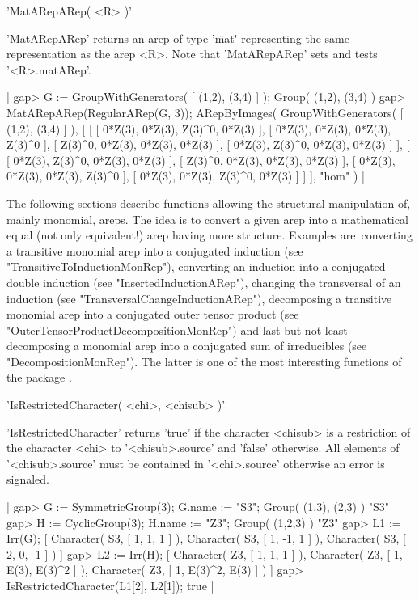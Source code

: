 
'MatARepARep( <R> )'

'MatARepARep' returns an arep of type '\"mat\"' representing 
the same representation as the arep <R>.
Note that 'MatARepARep' sets and tests '<R>.matARep'.

|    gap> G := GroupWithGenerators( [ (1,2), (3,4) ] );
    Group( (1,2), (3,4) )
    gap> MatARepARep(RegularARep(G, 3));
    ARepByImages(
      GroupWithGenerators( [ (1,2), (3,4) ] ),
      [ [ [ 0*Z(3), 0*Z(3), Z(3)^0, 0*Z(3) ], 
          [ 0*Z(3), 0*Z(3), 0*Z(3), Z(3)^0 ], 
          [ Z(3)^0, 0*Z(3), 0*Z(3), 0*Z(3) ], 
          [ 0*Z(3), Z(3)^0, 0*Z(3), 0*Z(3) ] ],
        [ [ 0*Z(3), Z(3)^0, 0*Z(3), 0*Z(3) ], 
          [ Z(3)^0, 0*Z(3), 0*Z(3), 0*Z(3) ], 
          [ 0*Z(3), 0*Z(3), 0*Z(3), Z(3)^0 ], 
          [ 0*Z(3), 0*Z(3), Z(3)^0, 0*Z(3) ] ]
      ],
      "hom"
    ) |


The following sections describe functions allowing the
structural manipulation of, mainly monomial, areps. The idea is 
to convert a given arep into a mathematical equal (not only equivalent!)
arep having more structure. 
Examples are\:\ converting a transitive monomial arep into 
a conjugated induction (see "TransitiveToInductionMonRep"), 
converting an induction into a conjugated
double induction (see "InsertedInductionARep"), 
changing the transversal of an induction
(see "TransversalChangeInductionARep"), 
decomposing a transitive monomial arep into a conjugated 
outer tensor product 
(see "OuterTensorProductDecompositionMonRep") 
and last but not least decomposing a monomial arep into a 
conjugated sum of irreducibles
(see "DecompositionMonRep").
The latter is one of the most interesting functions
of the package {\AREP}.

'IsRestrictedCharacter( <chi>, <chisub> )'

'IsRestrictedCharacter' returns 'true' if the character <chisub> 
is a restriction of the character <chi> to '<chisub>.source' and 
'false' otherwise. All elements of '<chisub>.source' must be 
contained in '<chi>.source' otherwise an error is signaled.

|    gap> G := SymmetricGroup(3); G.name := "S3";
    Group( (1,3), (2,3) )
    "S3"
    gap> H := CyclicGroup(3); H.name := "Z3";
    Group( (1,2,3) )
    "Z3"
    gap> L1 := Irr(G);
    [ Character( S3, [ 1, 1, 1 ] ), Character( S3, [ 1, -1, 1 ] ), 
      Character( S3, [ 2, 0, -1 ] ) ]
    gap> L2 := Irr(H);
    [ Character( Z3, [ 1, 1, 1 ] ), Character( Z3, [ 1, E(3), E(3)^2 ] ), 
      Character( Z3, [ 1, E(3)^2, E(3) ] ) ]
    gap> IsRestrictedCharacter(L1[2], L2[1]);
    true |

